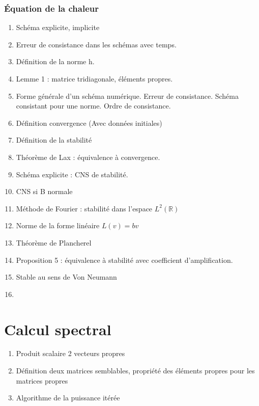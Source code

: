 \documentclass[11pt, twocolumn, landscape]{article}
\begin{document}
\section{Équation de la chaleur}
\begin{enumerate}
\item Schéma explicite, implicite
\item Erreur de consistance dans les schémas avec temps. 
\item Définition de la norme h. 
\item Lemme 1 : matrice tridiagonale, éléments propres. 
\item Forme générale d'un schéma numérique. Erreur de consistance. Schéma consistant pour une norme. Ordre de consistance.
\item Définition convergence (Avec données initiales)
\item Définition de la stabilité
\item Théorème de Lax : équivalence à convergence.
\item Schéma explicite : CNS de stabilité.
\item CNS si B normale
\item Méthode de Fourier : stabilité dans l'espace $L^2(\mathbb{R})$
\item Norme de la forme linéaire $L(v)=bv$
\item Théorème de Plancherel
\item Proposition 5 : équivalence à stabilité avec coefficient d'amplification.
\item Stable au sens de Von Neumann
\item 
\end{enumerate}

\part{Calcul spectral}
\begin{enumerate}
\item Produit scalaire 2 vecteurs propres
\item Définition deux matrices semblables, propriété des éléments propres pour les matrices propres
\item Algorithme de la puissance itérée
\end{enumerate}
\end{document}
